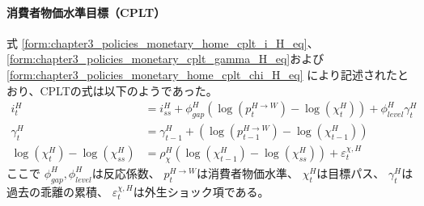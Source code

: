 \paragraph{消費者物価水準目標（CPLT）}
\label{sec:chapter5_beta_shock_policies_cplt}
式
\eqref{form:chapter3_policies_monetary_home_cplt_i_H_eq}、
\eqref{form:chapter3_policies_monetary_cplt_gamma_H_eq}および
\eqref{form:chapter3_policies_monetary_home_cplt_chi_H_eq}
により記述されたとおり、CPLTの式は以下のようであった。
\begin{align}
\label{form:chapter5_beta_shock_policies_cplt_i_H_eq}
    i_t^H&=i_{ss}^H+\phi_{gap}^H(\log(p_t^{H\to W})-\log(\chi_t^H))+\phi_{level}^H\gamma_t^H \\
\label{form:chapter5_beta_shock_policies_cplt_gamma_H_eq}
    \gamma_t^H&=\gamma_{t-1}^H+(\log(p_{t-1}^{H\to W})-\log(\chi_{t-1}^H)) \\
\label{form:chapter5_beta_shock_policies_cplt_chi_H_eq}
    \log(\chi_t^H)-\log(\chi_{ss}^H)&=\rho_{\chi}^H\left(\log(\chi_{t-1}^H)-\log(\chi_{ss}^H)\right)+\varepsilon_t^{\chi,H}
\end{align}
ここで
\(\phi_{gap}^H,\phi_{level}^H\)は反応係数、
\(p_t^{H\to W}\)は消費者物価水準、
\(\chi_t^H\)は目標パス、
\(\gamma_t^H\)は過去の乖離の累積、
\(\varepsilon_t^{\chi,H}\)は外生ショック項である。

